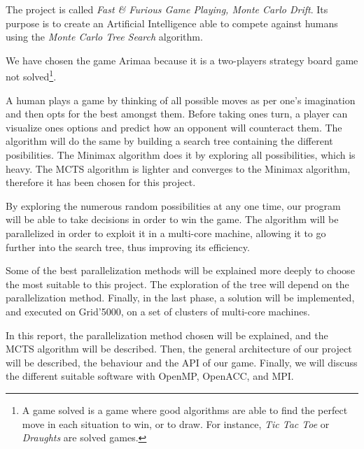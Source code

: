 The project is called \emph{Fast \& Furious Game Playing, Monte Carlo Drift}. Its purpose is to create an Artificial Intelligence able to compete against humans using the \emph{Monte Carlo Tree Search} algorithm.

We have chosen the game Arimaa because it is a two-players strategy board game not solved\footnote{A game solved is a game where good algorithms are able to find the perfect move in each situation to win, or to draw. For instance, \textit{Tic Tac Toe} or \textit{Draughts} are solved games.}.

A human plays a game by thinking of all possible moves as per one's imagination and then opts for the best amongst them. Before taking ones turn, a player can visualize ones options and predict how an opponent will counteract them. The algorithm will do the same by building a search tree containing the different posibilities. The Minimax algorithm does it by exploring all possibilities, which is heavy. The MCTS algorithm is lighter and converges to the Minimax algorithm, therefore it has been chosen for this project.

By exploring the numerous random possibilities at any one time, our program will be able to take decisions in order to win the game.
The algorithm will be parallelized in order to exploit it in a multi-core machine, allowing it to go further into the search tree, thus improving its efficiency.

Some of the best parallelization methods will be explained more deeply to choose the most suitable to this project.
The exploration of the tree will depend on the parallelization method.
Finally, in the last phase, a solution will be implemented, and executed on Grid'5000, on a set of clusters of multi-core machines.


In this report, the parallelization method chosen will be explained, and the MCTS algorithm will be described.
Then, the general architecture of our project will be described, the behaviour and the API of our game.
Finally, we will discuss the different suitable software with OpenMP, OpenACC, and MPI.
